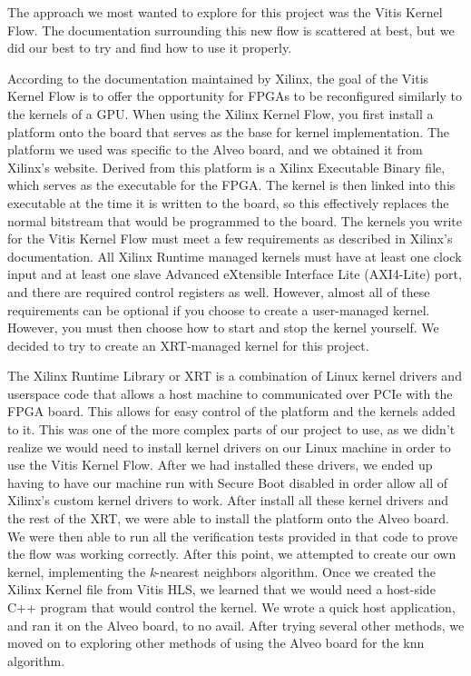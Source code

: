 \documentclass[11pt, final, conference, letterpaper, twocolumn]{IEEEtran}[2015/08/26]
\begin{document}
The approach we most wanted to explore for this project was the Vitis Kernel Flow. The documentation surrounding this new flow is scattered at best, but we did our best to try and find how to use it properly.

According to the documentation maintained by Xilinx, the goal of the Vitis Kernel Flow is to offer the opportunity for FPGAs to be reconfigured similarly to the kernels of a GPU. When using the Xilinx Kernel Flow, you first install a platform onto the board that serves as the base for kernel implementation. The platform we used was specific to the Alveo board, and we obtained it from Xilinx's website. Derived from this platform is a Xilinx Executable Binary file, which serves as the executable for the FPGA. The kernel is then linked into this executable at the time it is written to the board, so this effectively replaces the normal bitstream that would be programmed to the board. The kernels you write for the Vitis Kernel Flow must meet a few requirements as described in Xilinx's documentation. All Xilinx Runtime managed kernels must have at least one clock input and at least one slave Advanced eXtensible Interface Lite (AXI4-Lite) port, and there are required control registers as well. However, almost all of these requirements can be optional if you choose to create a user-managed kernel. However, you must then choose how to start and stop the kernel yourself. We decided to try to create an XRT-managed kernel for this project.

The Xilinx Runtime Library or XRT is a combination of Linux kernel drivers and userspace code that allows a host machine to communicated over PCIe with the FPGA board. This allows for easy control of the platform and the kernels added to it. This was one of the more complex parts of our project to use, as we didn't realize we would need to install kernel drivers on our Linux machine in order to use the Vitis Kernel Flow. After we had installed these drivers, we ended up having to have our machine run with Secure Boot disabled in order allow all of Xilinx's custom kernel drivers to work. After install all these kernel drivers and the rest of the XRT, we were able to install the platform onto the Alveo board. We were then able to run all the verification tests provided in that code to prove the flow was working correctly. After this point, we attempted to create our own kernel, implementing the \textit{k}-nearest neighbors algorithm. Once we created the Xilinx Kernel file from Vitis HLS, we learned that we would need a host-side C++ program that would control the kernel. We wrote a quick host application, and ran it on the Alveo board, to no avail. After trying several other methods, we moved on to exploring other methods of using the Alveo board for the knn algorithm.
\end{document}

